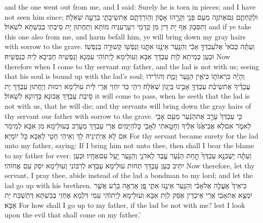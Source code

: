 {and the one went out from me, and I said: Surely he is torn in pieces; and I have not seen him since;}{}
{וּלְקַחְתֶּ֧ם גַּם\maqqaf אֶת\maqqaf זֶ֛ה מֵעִ֥ם פָּנַ֖י וְקָרָ֣הוּ אָס֑וֹן וְהֽוֹרַדְתֶּ֧ם אֶת\maqqaf שֵׂיבָתִ֛י בְּרָעָ֖ה שְׁאֹֽלָה׃}
{וְתִסְּבְוּן אַף יָת דֵּין מִן קֳדָמַי וִיעָרְעִנֵּיהּ מוֹתָא וְתַחֲתוּן יָת סֵיבְתִי בְּבִשְׁתָּא לִשְׁאוֹל׃}
{and if ye take this one also from me, and harm befall him, ye will bring down my gray hairs with sorrow to the grave.}{}
{וְעַתָּ֗ה כְּבֹאִי֙ אֶל\maqqaf עַבְדְּךָ֣ אָבִ֔י וְהַנַּ֖עַר אֵינֶ֣נּוּ אִתָּ֑נוּ וְנַפְשׁ֖וֹ קְשׁוּרָ֥ה בְנַפְשֽׁוֹ׃}
{וּכְעַן כְּמֵיתַא לְוָת עַבְדָּךְ אַבָּא וְעוּלֵימָא לָיְתוֹהִי עִמַּנָא וְנַפְשֵׁיהּ חַבִּיבָא לֵיהּ כְּנַפְשֵׁיהּ׃}
{Now therefore when I come to thy servant my father, and the lad is not with us; seeing that his soul is bound up with the lad’s soul;}{}
{וְהָיָ֗ה כִּרְאוֹת֛וֹ כִּי\maqqaf אֵ֥ין הַנַּ֖עַר וָמֵ֑ת וְהוֹרִ֨ידוּ עֲבָדֶ֜יךָ אֶת\maqqaf שֵׂיבַ֨ת עַבְדְּךָ֥ אָבִ֛ינוּ בְּיָג֖וֹן שְׁאֹֽלָה׃}
{וִיהֵי כַּד יִחְזֵי אֲרֵי לֵית עוּלֵימָא וִימוּת וְיַחֲתוּן עַבְדָּךְ יָת סֵיבַת עַבְדָּךְ אֲבוּנָא בְּדָווֹנָא לִשְׁאוֹל׃}
{it will come to pass, when he seeth that the lad is not with us, that he will die; and thy servants will bring down the gray hairs of thy servant our father with sorrow to the grave.}{}
{כִּ֤י עַבְדְּךָ֙ עָרַ֣ב אֶת\maqqaf הַנַּ֔עַר מֵעִ֥ם אָבִ֖י לֵאמֹ֑ר אִם\maqqaf לֹ֤א אֲבִיאֶ֙נּוּ֙ אֵלֶ֔יךָ וְחָטָ֥אתִי לְאָבִ֖י כׇּל\maqqaf הַיָּמִֽים׃}
{אֲרֵי עַבְדָּךְ מְעָרַב בְּעוּלֵימָא מִן אַבָּא לְמֵימַר אִם לָא אַיְתֵינֵיהּ לָךְ וְאֵיהֵי חָטֵי לְאַבָּא כָּל יוֹמַיָּא׃}
{For thy servant became surety for the lad unto my father, saying: If I bring him not unto thee, then shall I bear the blame to my father for ever.}{}
{וְעַתָּ֗ה יֵֽשֶׁב\maqqaf נָ֤א עַבְדְּךָ֙ תַּ֣חַת הַנַּ֔עַר עֶ֖בֶד לַֽאדֹנִ֑י וְהַנַּ֖עַר יַ֥עַל עִם\maqqaf אֶחָֽיו׃}
{וּכְעַן יִתֵּיב כְּעַן עַבְדָּךְ תְּחוֹת עוּלֵימָא עַבְדָּא לְרִבּוֹנִי וְעוּלֵימָא יִסַּק עִם אֲחוֹהִי׃}
{Now therefore, let thy servant, I pray thee, abide instead of the lad a bondman to my lord; and let the lad go up with his brethren.}{}
{כִּי\maqqaf אֵיךְ֙ אֶֽעֱלֶ֣ה אֶל\maqqaf אָבִ֔י וְהַנַּ֖עַר אֵינֶ֣נּוּ אִתִּ֑י פֶּ֚ן אֶרְאֶ֣ה בָרָ֔ע אֲשֶׁ֥ר יִמְצָ֖א אֶת\maqqaf אָבִֽי׃}
{אֲרֵי אֵיכְדֵין אֶסַּק לְוָת אַבָּא וְעוּלֵימָא לָיְתוֹהִי עִמִּי דִּלְמָא אֶחְזֵי בְּבִשְׁתָּא דְּתַשְׁכַּח יָת אַבָּא׃}
{For how shall I go up to my father, if the lad be not with me? lest I look upon the evil that shall come on my father.’}{}

